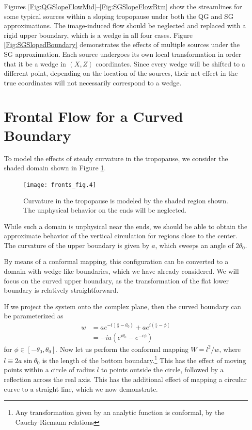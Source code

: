 \documentclass[11pt,onecolumn,oneside]{article}
\begin{document}
Figures \ref{Fig:QGSlopeFlowMid}--\ref{Fig:SGSlopeFlowBtm} show the streamlines for some typical sources within a sloping tropopause under both the QG and SG approximations. The image-induced flow should be neglected and replaced with a rigid upper boundary, which is a wedge in all four cases. Figure \ref{Fig:SGSlopedBoundary} demonstrates the effects of multiple sources under the SG approximation. Each source undergoes its own local transformation in order that it be a wedge in $(X,Z)$ coordinates. Since every wedge will be shifted to a different point, depending on the location of the sources, their net effect in the true coordinates will not necessarily correspond to a wedge.


\section{Frontal Flow for a Curved Boundary}

To model the effects of steady curvature in the tropopause, we consider the shaded domain shown in Figure \ref{Fig:CurvedDomain}.
\begin{figure}[ht]
\centering
\texttt{[image: fronts\_fig.4]}
\caption{\small Curvature in the tropopause is modeled by the shaded region shown. The unphysical behavior on the ends will be neglected.}
\label{Fig:CurvedDomain}
\end{figure}
While such a domain is unphysical near the ends, we should be able to obtain the approximate behavior of the vertical circulation for regions close to the center. The curvature of the upper boundary is given by $a$, which sweeps an angle of $2 \theta_0$.

By means of a conformal mapping, this configuration can be converted to a domain with wedge-like boundaries, which we have already considered. We will focus on the curved upper boundary, as the transformation of the flat lower boundary is relatively straightforward.

If we project the system onto the complex plane, then the curved boundary can be parameterized as
\[ \begin{split}
w &= ae^{-i\left(\frac{\pi}{2} - \theta_0\right)} + ae^{i\left(\frac{\pi}{2} - \phi\right)} \\
  &= -ia (e^{i\theta_0} -e^{-i\phi})
\end{split} \]
for $\phi \in [-\theta_0, \theta_0]$. Now let us perform the conformal mapping $W = l^2/w$, where $l \equiv 2 a \sin \theta_0$ is the length of the bottom boundary.\footnote{Any transformation given by an analytic function is conformal, by the Cauchy-Riemann relations} This has the effect of moving points within a circle of radius $l$ to points outside the circle, followed by a reflection across the real axis. This has the additional effect of mapping a circular curve to a straight line, which we now demonstrate.
\end{document}
